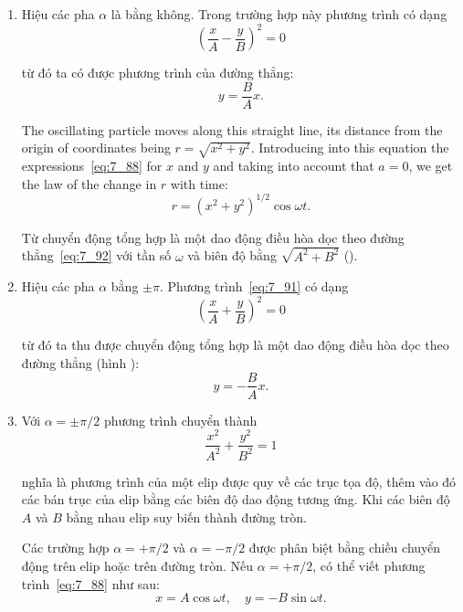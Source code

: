 \begin{enumerate}[1.]
	\item Hiệu các pha $\alpha$ là bằng không. Trong trường hợp này phương trình  có dạng
	\begin{equation*}
		\left(\frac{x}{A} - \frac{y}{B}\right)^{2} = 0
	\end{equation*}

	\noindent
	từ đó ta có được phương trình của đường thẳng:
	\begin{equation}\label{eq:7_92}
		y = \frac{B}{A}x.
	\end{equation}

	\noindent
	The oscillating particle moves along this straight line, its distance from the origin of coordinates being $r=\sqrt{x^2+y^2}$. Introducing into this equation the expressions~\eqref{eq:7_88} for $x$ and $y$ and taking into account that $a=0$, we get the law of the change in $r$ with time:
	\begin{equation}\label{eq:7_93}
		r = \left(x^2 + y^2\right)^{1/2}\cos\omega t.
	\end{equation}

	\noindent
	Từ  chuyển động tổng hợp là một dao động điều hòa dọc theo đường thẳng~\eqref{eq:7_92} với tần số $\omega$ và biên độ bằng $\sqrt{A^2+B^2}$ ().

	\item Hiệu các pha $\alpha$ bằng $\pm\pi$. Phương trình~\eqref{eq:7_91} có dạng
	\begin{equation*}
		\left(\frac{x}{A} + \frac{y}{B}\right)^{2} = 0
	\end{equation*}

	\noindent
	từ đó ta thu được chuyển động tổng hợp là một dao động điều hòa dọc theo đường thẳng (hình ):
	\begin{equation*}
		y = -\frac{B}{A}x.
	\end{equation*}

	\item Với $\alpha=\pm\pi/2$ phương trình  chuyển thành
	\begin{equation}\label{eq:7_94}
		\frac{x^2}{A^2} + \frac{y^2}{B^2} = 1
	\end{equation}

	\noindent
	nghĩa là phương trình của một elip được quy về các trục tọa độ, thêm vào đó các bán trục của elip bằng các biên độ dao động tương ứng. Khi các biên độ $A$ và $B$ bằng nhau elip suy biến thành đường tròn.

	Các trường hợp $\alpha=+\pi/2$ và $\alpha=-\pi/2$ được phân biệt bằng chiều chuyển động trên elip hoặc trên đường tròn. Nếu $\alpha=+\pi/2$, có thể viết phương trình~\eqref{eq:7_88} như sau:
	\begin{equation}\label{eq:7_95}
		x = A\cos\omega t,\quad y = -B\sin\omega t.
	\end{equation}


\end{enumerate}
